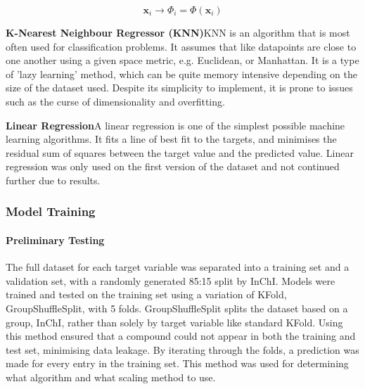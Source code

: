 \documentclass[11pt, titlepage]{article}
\begin{document}
\begin{description}
	\begin{equation}
		\mathbf{x}_i \rightarrow \Phi_i = \Phi(\mathbf{x}_i)
		\label{eq:featVec}
	\end{equation}
	\item \textbf{K-Nearest Neighbour Regressor (KNN)}\quad KNN is an algorithm that is most often used for classification problems. It assumes that like datapoints are close to one another using a given space metric, e.g. Euclidean, or Manhattan. It is a type of 'lazy learning' method, which can be quite memory intensive depending on the size of the dataset used. Despite its simplicity to implement, it is prone to issues such as the curse of dimensionality and overfitting\cite{KNN_IBM}.
	\item \textbf{Linear Regression}\quad A linear regression is one of the simplest possible machine learning algorithms. It fits a line of best fit to the targets, and minimises the residual sum of squares between the target value and the predicted value\cite{LinearRegression}. Linear regression was only used on the first version of the dataset and not continued further due to results. 
\end{description}

\subsubsection{Model Training}
\label{subsubsec:modelTraining}
\paragraph*{Preliminary Testing}
The full dataset for each target variable was separated into a training set and a validation set, with a randomly generated 85:15 split by InChI. Models were trained and tested on the training set using a variation of KFold, GroupShuffleSplit\cite{GroupShuffleSplit}, with 5 folds. GroupShuffleSplit splits the dataset based on a group, InChI, rather than solely by target variable like standard KFold. Using this method ensured that a compound could not appear in both the training and test set, minimising data leakage. By iterating through the folds, a prediction was made for every entry in the training set. This method was used for determining what algorithm and what scaling method to use.
\end{document}
